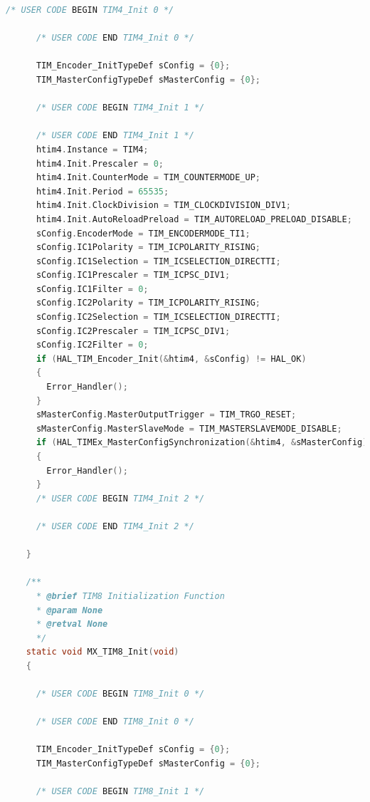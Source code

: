 \begin{lstlisting}[language=C, caption=メインコード(main.c)]
      /* USER CODE BEGIN TIM4_Init 0 */
    
      /* USER CODE END TIM4_Init 0 */
    
      TIM_Encoder_InitTypeDef sConfig = {0};
      TIM_MasterConfigTypeDef sMasterConfig = {0};
    
      /* USER CODE BEGIN TIM4_Init 1 */
    
      /* USER CODE END TIM4_Init 1 */
      htim4.Instance = TIM4;
      htim4.Init.Prescaler = 0;
      htim4.Init.CounterMode = TIM_COUNTERMODE_UP;
      htim4.Init.Period = 65535;
      htim4.Init.ClockDivision = TIM_CLOCKDIVISION_DIV1;
      htim4.Init.AutoReloadPreload = TIM_AUTORELOAD_PRELOAD_DISABLE;
      sConfig.EncoderMode = TIM_ENCODERMODE_TI1;
      sConfig.IC1Polarity = TIM_ICPOLARITY_RISING;
      sConfig.IC1Selection = TIM_ICSELECTION_DIRECTTI;
      sConfig.IC1Prescaler = TIM_ICPSC_DIV1;
      sConfig.IC1Filter = 0;
      sConfig.IC2Polarity = TIM_ICPOLARITY_RISING;
      sConfig.IC2Selection = TIM_ICSELECTION_DIRECTTI;
      sConfig.IC2Prescaler = TIM_ICPSC_DIV1;
      sConfig.IC2Filter = 0;
      if (HAL_TIM_Encoder_Init(&htim4, &sConfig) != HAL_OK)
      {
        Error_Handler();
      }
      sMasterConfig.MasterOutputTrigger = TIM_TRGO_RESET;
      sMasterConfig.MasterSlaveMode = TIM_MASTERSLAVEMODE_DISABLE;
      if (HAL_TIMEx_MasterConfigSynchronization(&htim4, &sMasterConfig) != HAL_OK)
      {
        Error_Handler();
      }
      /* USER CODE BEGIN TIM4_Init 2 */
    
      /* USER CODE END TIM4_Init 2 */
    
    }
    
    /**
      * @brief TIM8 Initialization Function
      * @param None
      * @retval None
      */
    static void MX_TIM8_Init(void)
    {
    
      /* USER CODE BEGIN TIM8_Init 0 */
    
      /* USER CODE END TIM8_Init 0 */
    
      TIM_Encoder_InitTypeDef sConfig = {0};
      TIM_MasterConfigTypeDef sMasterConfig = {0};
    
      /* USER CODE BEGIN TIM8_Init 1 */
    

\end{lstlisting}

